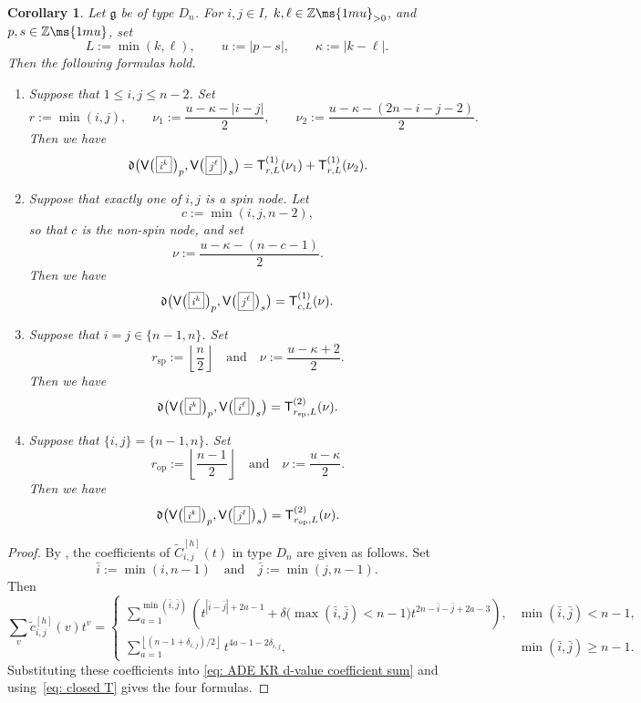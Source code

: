 \documentclass[12pt, leqno]{amsart}
\numberwithin{equation}{section}
\theoremstyle{plain}
\newtheorem{corollary}[lemma]{Corollary}
\theoremstyle{definition}
\newcommand{\Vkm}[1]{%
  \ttV\bigl(\hspace{0.2ex}\scalebox{.8}{\(\boxed{#1}\)}\hspace{0.2ex}\bigr)%
}
\newcommand{\seteq}{\mathbin{:=}}
\newcommand{\g}{\mathfrak{g}}
\newcommand{\Z}{\mathbb{Z}\ms{1mu}}
\newcommand{\de}{\mathfrak{d}}
\newcommand{\tC}{\widetilde{C}}
\newcommand{\tc}{\widetilde{c}}
\newcommand{\sfT}{\mathsf{T}}
\newcommand{\ttV}{\mathtt{V}}
\newcommand{\qtq}[1][{and}]{\quad\text{{#1}}\quad}
\newcommand{\ee}{\end{enumerate}}
\newcommand{\bnum}{\begin{enumerate}[{\rm (i)}]}
\begin{document}
\begin{corollary}\label{cor: type D closed d-value formulas}
Let \(\g\) be of type \(D_n\).  For
\(i,j\in I\), \(k,\ell\in\Z_{>0}\), and \(p,s\in\Z\), set
\[
L\seteq\min(k,\ell), \qquad u\seteq|p-s|, \qquad \kappa\seteq|k-\ell|.
\]
Then the following formulas hold.
\bnum
\item Suppose that \(1\leq i,j\leq n-2\).  Set
\[
r\seteq\min(i,j), \qquad \nu_1 \seteq \frac{u-\kappa-|i-j|}{2}, \qquad \nu_2 \seteq \frac{u-\kappa-(2n-i-j-2)}{2}.
\]
Then we have
\[
\de\bigl( \Vkm{i^k}_p, \Vkm{j^\ell}_s \bigr)  = \sfT^{(1)}_{r,L}(\nu_1) + \sfT^{(1)}_{r,L}(\nu_2).
\]

\item Suppose that exactly one of \(i,j\) is a spin node.  Let
\[
c\seteq\min(i,j,n-2),
\]
so that \(c\) is the non-spin node, and set
\[
\nu \seteq \frac{u-\kappa-(n-c-1)}{2}.
\]
Then we have
\[
\de\bigl( \Vkm{i^k}_p, \Vkm{j^\ell}_s \bigr) = \sfT^{(1)}_{c,L}(\nu). 
\]

\item Suppose that \(i=j\in\{n-1,n\}\).  Set
\[
r_{\mathrm{sp}} \seteq \left\lfloor\frac{n}{2}\right\rfloor \qtq \nu \seteq \frac{u-\kappa+2}{2}.
\]
Then we have
\[
\de\bigl( \Vkm{i^k}_p, \Vkm{i^\ell}_s \bigr) = \sfT^{(2)}_{r_{\mathrm{sp}},L}(\nu).
\]

\item Suppose that \(\{i,j\}=\{n-1,n\}\).  Set
\[
r_{\mathrm{op}} \seteq \left\lfloor\frac{n-1}{2}\right\rfloor
\qtq
\nu \seteq \frac{u-\kappa}{2}.
\]
Then we have
\[
\de\bigl( \Vkm{i^k}_p, \Vkm{j^\ell}_s \bigr) = \sfT^{(2)}_{r_{\mathrm{op}},L}(\nu).
\]
\ee
\end{corollary}

\begin{proof}
By \cite[Theorem~4.12(2)]{KO23}, the coefficients of \(\tC_{i,j}^{[h]}(t)\) in type \(D_n\)
are given as follows. Set
\[
\bar i\seteq\min(i,n-1)
\qtq
\bar j\seteq\min(j,n-1).
\]
Then
\[
\sum_v \tc_{i,j}^{[h]}(v)t^v
=
\begin{cases}
\displaystyle
\sum_{a=1}^{\min(\bar i,\bar j)}
\left(
t^{|\bar i-\bar j|+2a-1}
+
\delta\bigl(\max(\bar i,\bar j)<n-1\bigr)
t^{2n-\bar i-\bar j+2a-3}
\right),
& \min(\bar i,\bar j)<n-1,
\\[4mm]
\displaystyle
\sum_{a=1}^{\left\lfloor
  (n-1+\delta_{i,j})/2
\right\rfloor}
t^{4a-1-2\delta_{i,j}},
& \min(\bar i,\bar j)\geq n-1.
\end{cases}
\]
Substituting these coefficients into
\eqref{eq: ADE KR d-value coefficient sum}
and using~\eqref{eq: closed T} gives the four formulas.
\end{proof}
\end{document}
